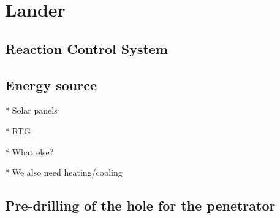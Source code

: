 \chapter{Lander}





\section{Reaction Control System}






\section{Energy source}

* Solar panels

* RTG

* What else?

* We also need heating/cooling

\section{Pre-drilling of the hole for the penetrator}
